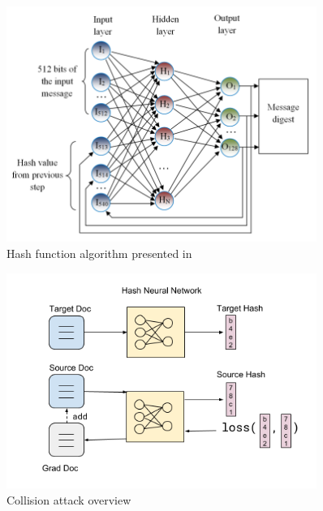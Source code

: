 \documentclass[final]{beamer}
\newlength{\sepwid}
\newlength{\onecolwid}
\newlength{\twocolwid}
\begin{document}
\begin{frame}[t]
\begin{columns}[t]
\begin{column}{\onecolwid}

\begin{figure}
    \includegraphics[width=0.8\linewidth]{hash_nn_architecture}
    \caption{Hash function algorithm presented in \cite{hash1}}
    \label{fig:hashNN}
\end{figure}

\begin{figure}
    \includegraphics[width=0.8\linewidth]{model_diagram}
        \caption{Collision attack overview} 
        \label{fig:model}
\end{figure}



\end{column} %

\begin{column}{\sepwid}\end{column} %

\begin{column}{\twocolwid} %


\end{column}
\end{columns}
\end{frame}
\end{document}

